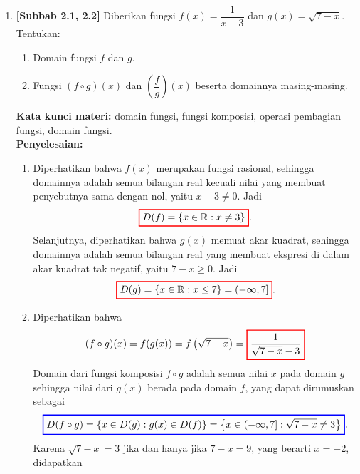 \documentclass[10pt,openany,a4paper]{article}
\theoremstyle{definition}
\theoremstyle{definition}
\theoremstyle{plain}
\newenvironment{jawab}[2][tes]{%
\par\noindent\textbf{Kata kunci materi:} #1.\\
\textbf{Penyelesaian:} #2%
}{}
\begin{document}
\begin{enumerate}
    \item \textbf{[Subbab 2.1, 2.2]} Diberikan fungsi $f(x)=\dfrac{1}{x-3}$ dan $g(x)=\sqrt{7-x}$. Tentukan:
    \begin{enumerate}
        \item Domain fungsi $f$ dan $g$.
        \item Fungsi $(f\circ g)(x)$ dan $\left(\dfrac{f}{g}\right)(x)$ beserta domainnya masing-masing.
    \end{enumerate}
    \begin{jawab}[domain fungsi, fungsi komposisi, operasi pembagian fungsi, domain fungsi]{
        \begin{enumerate}
            \item Diperhatikan bahwa $f(x)$ merupakan fungsi rasional, sehingga domainnya adalah semua bilangan real kecuali nilai yang membuat penyebutnya sama dengan nol, yaitu $x-3\neq 0$. Jadi
            \[
            \colorlet{oldcolor}{.}
        \color{red}
        \setlength{\fboxrule}{1pt} \boxed{\color{oldcolor}D(f)=\{x \in \mathbb{R} : x \neq 3\}}\color{oldcolor}.
            \]
            Selanjutnya, diperhatikan bahwa $g(x)$ memuat akar kuadrat, sehingga domainnya adalah semua bilangan real yang membuat ekspresi di dalam akar kuadrat tak negatif, yaitu $7-x\geq 0$. Jadi
            \[
            \colorlet{oldcolor}{.}
        \color{red}
        \setlength{\fboxrule}{1pt} \boxed{\color{oldcolor}D(g)=\{x \in \mathbb{R} : x \leq 7\}=(-\infty,7]}\color{oldcolor}.
            \]
            \item Diperhatikan bahwa
            \begin{align*}
                (f\circ g)(x) = f(g(x)) = f\left(\sqrt{7-x}\right) = \colorlet{oldcolor}{.}
        \color{red}
        \setlength{\fboxrule}{1pt} \boxed{\color{oldcolor}\frac{1}{\sqrt{7-x} - 3}}\color{oldcolor}
            \end{align*}
            Domain dari fungsi komposisi $f\circ g$ adalah semua nilai $x$ pada domain $g$ sehingga nilai dari $g(x)$ berada pada domain $f$, yang dapat dirumuskan sebagai
            \begin{align*}
                \colorlet{oldcolor}{.}
        \color{blue}
        \setlength{\fboxrule}{1pt} \boxed{\color{oldcolor}D(f\circ g) = \{x \in D(g) : g(x) \in D(f)\} = \left\{x \in (-\infty, 7] : \sqrt{7-x} \neq 3\right\}}\color{oldcolor}.
            \end{align*}
            Karena $\sqrt{7-x} = 3$ jika dan hanya jika $7-x = 9$, yang berarti $x = -2$, didapatkan

\end{enumerate}}
\end{jawab}
\end{enumerate}
\end{document}
